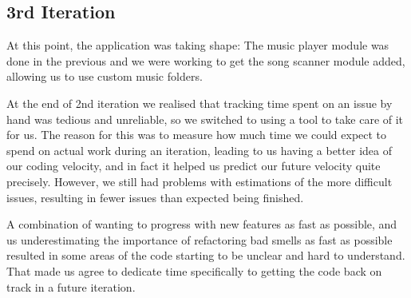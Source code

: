 \subsection{3rd Iteration}
At this point, the application was taking shape: The music player module was done in the previous and we were working to get the song scanner module added, allowing us to use custom music folders.

At the end of 2nd iteration we realised that tracking time spent on an issue by hand was tedious and unreliable, so we switched to using a tool to take care of it for us. The reason for this was to measure how much time we could expect to spend on actual work during an iteration, leading to us having a better idea of our coding velocity, and in fact it helped us predict our future velocity quite precisely. However, we still had problems with estimations of the more difficult issues, resulting in fewer issues than expected being finished.

A combination of wanting to progress with new features as fast as possible, and us underestimating the importance of refactoring bad smells as fast as possible resulted in some areas of the code starting to be unclear and hard to understand. That made us agree to dedicate time specifically to getting the code back on track in a future iteration.

